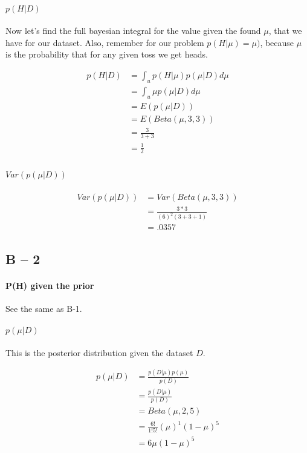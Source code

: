 \documentclass[paper=a4, fontsize=11pt]{scrartcl} %
\begin{document}
\paragraph{$p(H|D)$}
Now let's find the full bayesian integral for the value given the found $\mu$, that we have for our dataset.  Also, remember for our problem $p(H|\mu) = \mu)$, because $\mu$ is the probability that for any given toss we get heads.

\begin{align}
p(H|D) &= \int_u p(H|\mu)p(\mu|D)d\mu \\
&= \int_u \mu p(\mu|D)d\mu \\
&= E( p(\mu|D)) \\
&= E( Beta(\mu,3,3)) \\
&= \frac{3}{3+3} \\
&= \frac{1}{2} \\
\end{align}

\paragraph{$Var(p(\mu|D))$}

\begin{align}
Var(p(\mu|D)) &=  Var(Beta(\mu,3,3)) \\
&= \frac{3*3}{(6)^2(3+3+1)} \\
&= .0357
\end{align}

\subsection{B -- 2}
\paragraph{P(H) given the prior}
See the same as B-1.

\paragraph{$p(\mu|D)$}
This is the posterior distribution given the dataset $D$.

\begin{align}
p(\mu|D) &= \frac{p(D|\mu)p(\mu)}{p(D)} \\
&= \frac{p(D|\mu)}{p(D)} \\
&= Beta(\mu,2,5) \\
&= \frac{6!}{1!5!}(\mu)^1(1-\mu)^5 \\
& = 6 \mu(1-\mu)^5
\end{align}
\end{document}
